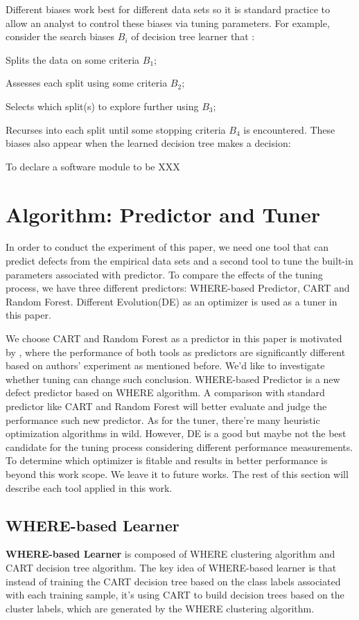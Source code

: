 Different biases work best for different data sets so it is standard practice to allow an analyst
to control these biases via tuning parameters. For example, consider the search biases
$B_i$ of decision tree learner that :
\bi
\item Splits the data on some criteria $B_1$;
\item Assesses each split using some criteria $B_2$;
\item Selects which split(s) to explore further using $B_3$;
\item Recurses into each split until some stopping criteria $B_4$ is encountered.
\ei
These biases also appear when the learned decision tree makes a decision:
\bi
\item To declare a software module to be XXX
\ei


\section{Algorithm: Predictor and Tuner}

In order to conduct the experiment of this paper, we need one tool that can predict defects 
from the empirical data sets and a second tool to tune the built-in parameters associated with 
predictor. To compare the effects of the tuning process, we have three different predictors: 
WHERE-based Predictor, CART and Random Forest. Different Evolution(DE) as an optimizer 
is used as a tuner in this paper.

We choose CART and Random Forest as a predictor in this paper is motivated by 
\cite{lessmann2008benchmarking}, where the performance of both tools as predictors are 
significantly different based on authors' experiment as mentioned before. We'd like to 
investigate whether tuning can change such conclusion. WHERE-based Predictor is a new 
defect predictor based on WHERE\cite{menzies2013local} algorithm. A comparison with 
standard predictor like CART and Random Forest will better evaluate and judge the 
performance such new predictor. As for the tuner, there're many heuristic optimization 
algorithms in wild. However, DE is a good but maybe not the best candidate for the tuning 
process considering different performance measurements. To determine which optimizer is 
fitable and results in better performance is beyond this work scope. We leave it to future 
works. The rest of this section will describe each tool applied in this work.

 \subsection{WHERE-based Learner}
\textbf{WHERE-based Learner} is composed of WHERE clustering algorithm and CART 
decision tree algorithm. The key idea of WHERE-based learner is that  instead of training the 
CART decision tree based on the class labels associated with each training sample, it's using 
CART to build decision trees based on the cluster labels, which are generated by the WHERE 
clustering algorithm.
 
